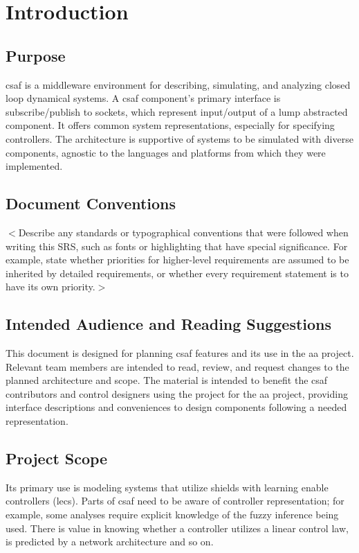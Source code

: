 \chapter{Introduction}

\section{Purpose}
\acrshort{csaf} is a middleware environment for describing, simulating, and analyzing closed loop dynamical systems. A \acrshort{csaf} component's primary interface is subscribe/publish to sockets, which represent input/output of a lump abstracted component. It offers common system representations, especially for specifying controllers. The architecture is supportive of systems to be simulated with diverse components, agnostic to the languages and platforms from which they were implemented.


\section{Document Conventions}
$<$Describe any standards or typographical conventions that were followed when 
writing this SRS, such as fonts or highlighting that have special significance.  
For example, state whether priorities  for higher-level requirements are assumed 
to be inherited by detailed requirements, or whether every requirement statement 
is to have its own priority.$>$


\section{Intended Audience and Reading Suggestions}

This document is designed for planning \acrshort{csaf} features and its use in the \acrlong{aa} project. Relevant team members are intended to read, review, and request changes to the planned architecture and scope. The material is intended to benefit the \acrshort{csaf} contributors and control designers using the project for the \acrlong{aa} project, providing interface descriptions and conveniences to design components following a needed representation.\\

\section{Project Scope}
Its primary use is modeling systems that utilize shields with learning enable controllers (\acrshort{lec}s). Parts of \acrshort{csaf} need to be aware of controller representation; for example, some analyses require explicit knowledge of the fuzzy inference being used. There is value in knowing whether a controller utilizes a linear control law, is predicted by a network architecture and so on.\\

